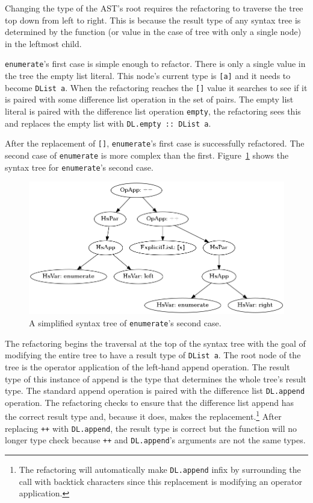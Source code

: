 Changing the type of the AST's root requires the refactoring to traverse the tree top down from left to right. This is because the result type of any syntax tree is determined by the function (or value in the case of tree with only a single node) in the leftmost child. 

\texttt{enumerate}'s first case is simple enough to refactor. There is only a single value in the tree the empty list literal. This node's current type is \texttt{[a]} and it needs to become \texttt{DList a}. When the refactoring reaches the \texttt{[]} value it searches to see if it is paired with some difference list operation in the set of pairs. The empty list literal is paired with the difference list operation \texttt{empty}, the refactoring sees this and replaces the empty list with \texttt{DL.empty :: DList a}.

After the replacement of \texttt{[]}, \texttt{enumerate}'s first case is successfully refactored. The second case of \texttt{enumerate} is more complex than the first. Figure~\ref{enumAST} shows the syntax tree for \texttt{enumerate}'s second case. 

\begin{figure}[h]
	\begin{center}
		\includegraphics[scale=.5]{graphVis/Chapter3/enumerate.png}
	\end{center}
	\caption{A simplified syntax tree of \texttt{enumerate}'s second case.}
	\label{enumAST}
\end{figure}

The refactoring begins the traversal at the top of the syntax tree with the goal of modifying the entire tree to have a result type of \texttt{DList a}. The root node of the tree is the operator application of the left-hand append operation. The result type of this instance of append is the type that determines the whole tree's result type. The standard append operation is paired with the difference list \texttt{DL.append} operation. The refactoring checks to ensure that the difference list append has the correct result type and, because it does, makes the replacement.\footnote{The refactoring will automatically make \texttt{DL.append} infix by surrounding the call with backtick characters since this replacement is modifying an operator application.} After replacing \texttt{++} with \texttt{DL.append}, the result type is correct but the function will no longer type check because \texttt{++} and \texttt{DL.append}'s arguments are not the same types. 

